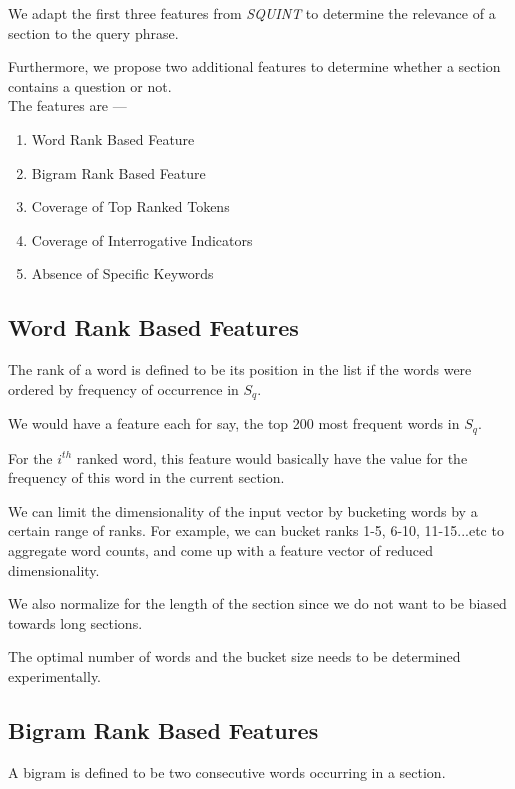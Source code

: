 \documentclass[10pt,a4paper]{report}
\begin{document}
We adapt the first three features from \textit{SQUINT} to determine the relevance of a section to the query phrase\cite{squint}. 

Furthermore, we propose two additional features to determine whether a section contains a question or not. \\

The features are ---

\begin{enumerate}
	\item Word Rank Based Feature
	\item Bigram Rank Based Feature
	\item Coverage of Top Ranked Tokens
	\item Coverage of Interrogative Indicators
	\item Absence of Specific Keywords
\end{enumerate}


\subsection {Word Rank Based Features}

The rank of a word is defined to be its position in the list if the words were ordered by frequency of occurrence in \textbf{$S_{q}$}.\cite{squint}

We would have a feature each for say, the top 200 most frequent words in \textbf{$S_{q}$}. 

For the $i^{th}$ ranked word, this feature would basically have the value for the frequency of this word in the current section. 

We can limit the dimensionality of the input vector by bucketing words by a certain range of ranks. 
For example, we can bucket ranks 1-5, 6-10, 11-15...etc to aggregate word counts, and come up with a feature vector of reduced dimensionality. 

We also normalize for the length of the section since we do not want to be biased towards long sections.

The optimal number of words and the bucket size needs to be determined experimentally.

\subsection {Bigram Rank Based Features}

A bigram is defined to be two consecutive words occurring in a section.\cite{squint}
\end{document}
